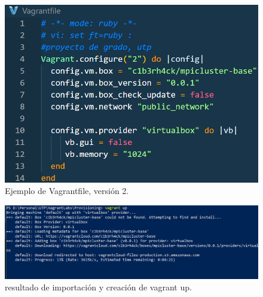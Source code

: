 \documentclass[letterpaper, 12pt, oneside]{article}
\begin{document}
    \begin{figure}[H]
        \includegraphics[scale=1.2]{img/provision/vagrantbox.png}
        \caption{Ejemplo de Vagrantfile, versión 2. }
        \label{fig:vafile2}
    \end{figure}
    
    
    \begin{figure}[H]
        \includegraphics[scale=0.7]{img/provision/vagrantbox2.png}
        \caption{resultado de importación y creación de vagrant up.}
        \label{fig:va6}
    \end{figure}
    
\end{document}
